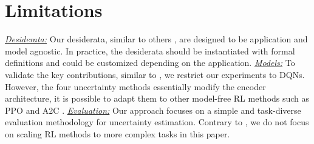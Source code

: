 \section{Limitations}
\label{sec:limitations_011}

\underline{\textit{Desiderata:}} Our desiderata, similar to others \citep{graph-postnet, desiderata-ml-lifecycle, overview-interpretable-ml}, are designed to be application and model agnostic. In practice, the desiderata should be instantiated with formal definitions and could be customized depending on the application. \underline{\textit{Models:}} To validate the key contributions, similar to \citep{distributional-rl-prespective, iqn, bootstrapped-dqn}, we restrict our experiments to DQNs. However, the four uncertainty methods essentially modify the encoder architecture, it is possible to adapt them to other model-free RL methods such as PPO \citep{ppo} and A2C \citep{a2c}. \underline{\textit{Evaluation:}} Our approach focuses on a simple and task-diverse evaluation methodology for uncertainty estimation. Contrary to \citet{procgen}, we do not focus on scaling RL methods to more complex tasks in this paper. %
